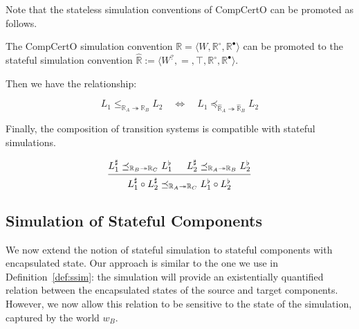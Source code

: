 \documentclass[acmsmall,screen,review,anonymous]{acmart}
\newcommand{\que}{\circ}
\newcommand{\ans}{\bullet}
\begin{document}
Note that the stateless simulation conventions of CompCertO
can be promoted as follows.

\begin{definition}
The CompCertO simulation convention
$\mathbb{R} = \langle W, \mathbb{R}^\que, \mathbb{R}^\ans \rangle$
can be promoted to the stateful simulation convention
$\hat{\mathbb{R}} :=
 \langle W^?, {=}, \top, \mathbb{R}^\que, \mathbb{R}^\ans \rangle$.
\end{definition}

Then we have the relationship:
\begin{lemma}
\[
  L_1 \le_{\mathbb{R}_A \twoheadrightarrow \mathbb{R}_B} L_2
  \quad \Leftrightarrow \quad
  L_1 \preceq_{\hat{\mathbb{R}}_A \twoheadrightarrow \hat{\mathbb{R}}_B} L_2
\]
\end{lemma}

Finally,
the composition of transition systems
is compatible with stateful simulations.

\begin{lemma}
\[
  \begin{prooftree}
    \hypo{
      L_1^\sharp
      \preceq_{\mathbb{R}_B \twoheadrightarrow \mathbb{R}_C}
      L_1^\flat}
    \hypo{
      L_2^\sharp
      \preceq_{\mathbb{R}_A \twoheadrightarrow \mathbb{R}_B}
      L_2^\flat}
    \infer2{
      L_1^\sharp \circ L_2^\sharp
      \preceq_{\mathbb{R}_A \twoheadrightarrow \mathbb{R}_C}
      L_1^\flat \circ L_2^\flat}
  \end{prooftree}
\]
\end{lemma}



\subsection{Simulation of Stateful Components}

We now extend the notion of stateful simulation
to stateful components with encapsulated state.
Our approach is similar to the one we use in Definition~\ref{def:ssim}:
the simulation will provide an existentially quantified
relation between the encapsulated states of the source and target
components.
However,
we now allow this relation to be sensitive to the state of the simulation,
captured by the world $w_B$.
\end{document}
